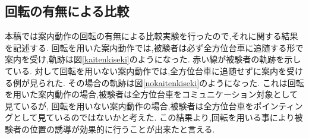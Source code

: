 \begin{comment}
\begin{figure}[htbp]
 \begin{minipage}{0.5\hsize}
\begin{center}
\texttt{[image: model3.eps]}
\caption{モデルC}
\label{model3}
\end{center}
 \end{minipage}
 \begin{minipage}{0.5\hsize}
\begin{center}
\texttt{[image: model4.eps]}
\caption{モデルD}
\label{model4}
\end{center}
 \end{minipage}
\end{figure}
\end{comment}




\subsection{回転の有無による比較}
本稿では案内動作の回転の有無による比較実験を行ったので,それに関する結果を記述する.
回転を用いた案内動作では,被験者は必ず全方位台車に追随する形で案内を受け,軌跡は図\ref{kaitenkiseki}のようになった.
赤い線が被験者の軌跡を示している.
対して回転を用いない案内動作では,全方位台車に追随せずに案内を受ける例が見られた.
その場合の軌跡は図\ref{nokaitenkiseki}のようになった.
これは回転を用いた案内動作の場合,被験者は全方位台車をコミュニケーション対象として見ているが,
回転を用いない案内動作の場合,被験者は全方位台車をポインティングとして見ているのではないかと考えた.
この結果より,回転を用いる事により被験者の位置の誘導が効果的に行うことが出来たと言える.

\begin{comment}
\begin{figure}[htbp]
 \begin{minipage}{0.5\hsize}
\begin{center}
\texttt{[image: kaitenkiseki.eps]}
\caption{回転を用いた案内動作における被験者の軌跡}
\label{kaitenkiseki}
\end{center}
 \end{minipage}
 \begin{minipage}{0.5\hsize}
\begin{center}
\texttt{[image: nokaitenkiseki.eps]}
\caption{回転を用いない案内動作における被験者の軌跡}
\label{nokaitenkiseki}
\end{center}
 \end{minipage}
\end{figure}
\end{comment}


